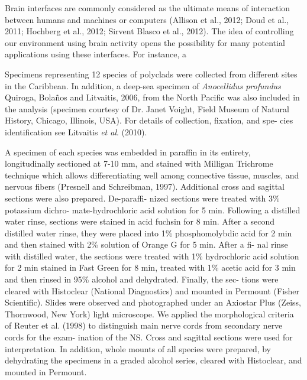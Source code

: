\begin{multicols}{2}
\par{}Brain interfaces are commonly considered as the
ultimate means of interaction between humans and
machines or computers (Allison et al., 2012; Doud et al.,
2011; Hochberg et al., 2012; Sirvent Blasco et al.,
2012). The idea of controlling our environment using
brain activity opens the possibility for many potential
applications using these interfaces. For instance, a


\lipsum



\par{}Specimens representing 12 species of polyclads were
collected from different sites in the Caribbean. In addition,
a deep-sea specimen of \textit{Anocellidus profundus} Quiroga,
Bolaños and Litvaitis, 2006, from the North Pacific was
also included in the analysis (specimen courtesy of Dr.
Janet Voight, Field Museum of Natural History, Chicago,
Illinois, USA). For details of collection, fixation, and spe-
cies identification see Litvaitis \textit{et al}. (2010).


\par{}A specimen of each species was embedded in paraffin
in its entirety, longitudinally sectioned at 7-10 mm, and
stained with Milligan Trichrome technique which allows
differentiating well among connective tissue, muscles, and
nervous fibers (Presnell and Schreibman, 1997). Additional
cross and sagittal sections were also prepared. De-paraffi-
nized sections were treated with 3\% potassium dichro-
mate-hydrochloric acid solution for 5 min. Following a
distilled water rinse, sections were stained in acid fuchsin
for 8 min. After a second distilled water rinse, they were
placed into 1\% phosphomolybdic acid for 2 min and then
stained with 2\% solution of Orange G for 5 min. After a fi-
nal rinse with distilled water, the sections were treated with
1\% hydrochloric acid solution for 2 min stained in Fast
Green for 8 min, treated with 1\% acetic acid for 3 min and
then rinsed in 95\% alcohol and dehydrated. Finally, the sec-
tions were cleared with Histoclear (National Diagnostics)
and mounted in Permount (Fisher Scientific). Slides were
observed and photographed under an Axiostar Plus (Zeiss,
Thornwood, New York) light microscope. We applied the
morphological criteria of Reuter et al. (1998) to distinguish
main nerve cords from secondary nerve cords for the exam-
ination of the NS. Cross and sagittal sections were used for
interpretation. In addition, whole mounts of all species
were prepared, by dehydrating the specimens in a graded
alcohol series, cleared with Histoclear, and mounted in
Permount.


\end{multicols}
